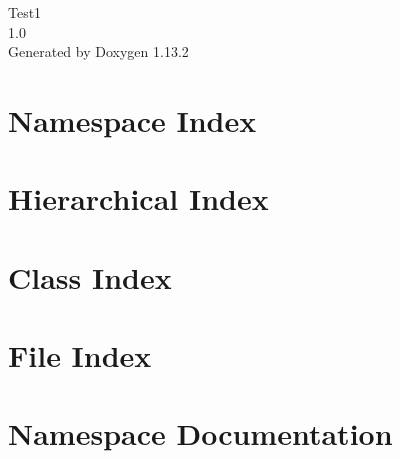 \documentclass[twoside]{book}
\newcommand{\+}{\discretionary{\mbox{\scriptsize$\hookleftarrow$}}{}{}}
\newcommand{\clearemptydoublepage}{%
    \newpage{\pagestyle{empty}\cleardoublepage}%
  }
\begin{document}
  \raggedbottom
    \hypersetup{pageanchor=false,
                bookmarksnumbered=true,
                pdfencoding=unicode
               }
  \begin{titlepage}
  \vspace*{7cm}
  \begin{center}%
  {\Large Test1}\\
  [1ex]\large 1.\+0 \\
  \vspace*{1cm}
  {\large Generated by Doxygen 1.13.2}\\
  \end{center}
  \end{titlepage}
  \clearemptydoublepage
  \tableofcontents
  \clearemptydoublepage
  \hypersetup{pageanchor=true}
\chapter{Namespace Index}

\chapter{Hierarchical Index}

\chapter{Class Index}

\chapter{File Index}

\chapter{Namespace Documentation}






\end{document}
